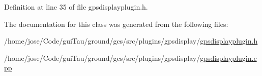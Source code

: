 Definition at line 35 of file gpsdisplayplugin.\-h.



The documentation for this class was generated from the following files\-:\begin{DoxyCompactItemize}
\item 
/home/jose/\-Code/gui\-Tau/ground/gcs/src/plugins/gpsdisplay/\hyperlink{gpsdisplayplugin_8h}{gpsdisplayplugin.\-h}\item 
/home/jose/\-Code/gui\-Tau/ground/gcs/src/plugins/gpsdisplay/\hyperlink{gpsdisplayplugin_8cpp}{gpsdisplayplugin.\-cpp}\end{DoxyCompactItemize}

